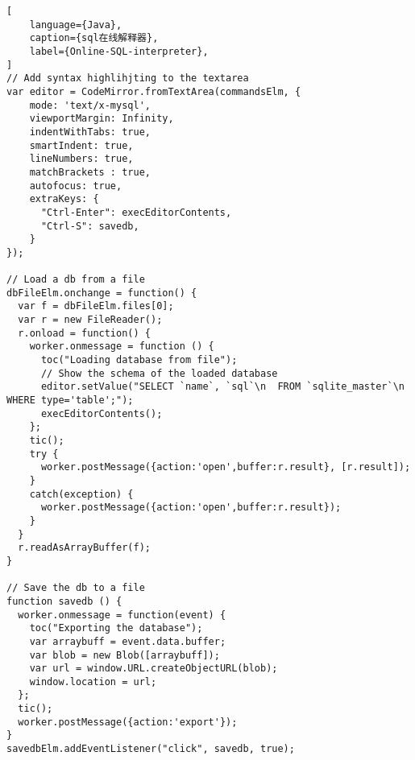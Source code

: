\begin{lstlisting}[
    language={Java},
    caption={sql在线解释器},
    label={Online-SQL-interpreter},
]
// Add syntax highlihjting to the textarea
var editor = CodeMirror.fromTextArea(commandsElm, {
    mode: 'text/x-mysql',
    viewportMargin: Infinity,
    indentWithTabs: true,
    smartIndent: true,
    lineNumbers: true,
    matchBrackets : true,
    autofocus: true,
    extraKeys: {
      "Ctrl-Enter": execEditorContents,
      "Ctrl-S": savedb,
    }
});

// Load a db from a file
dbFileElm.onchange = function() {
  var f = dbFileElm.files[0];
  var r = new FileReader();
  r.onload = function() {
    worker.onmessage = function () {
      toc("Loading database from file");
      // Show the schema of the loaded database
      editor.setValue("SELECT `name`, `sql`\n  FROM `sqlite_master`\n  WHERE type='table';");
      execEditorContents();
    };
    tic();
    try {
      worker.postMessage({action:'open',buffer:r.result}, [r.result]);
    }
    catch(exception) {
      worker.postMessage({action:'open',buffer:r.result});
    }
  }
  r.readAsArrayBuffer(f);
}

// Save the db to a file
function savedb () {
  worker.onmessage = function(event) {
    toc("Exporting the database");
    var arraybuff = event.data.buffer;
    var blob = new Blob([arraybuff]);
    var url = window.URL.createObjectURL(blob);
    window.location = url;
  };
  tic();
  worker.postMessage({action:'export'});
}
savedbElm.addEventListener("click", savedb, true);
\end{lstlisting}

